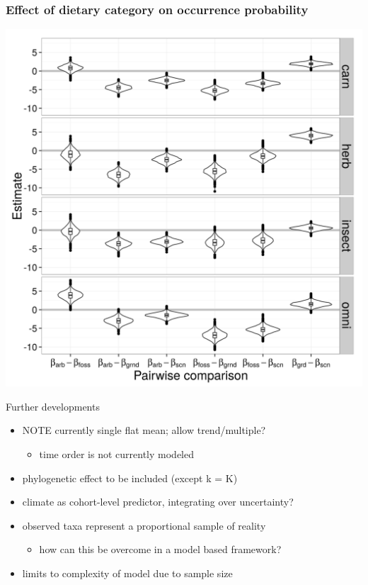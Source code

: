 \documentclass{beamer}
\begin{document}
\begin{frame}
  \frametitle{Effect of dietary category on occurrence probability}
  \begin{center}
    \includegraphics[width=\textwidth,height=0.8\textheight,keepaspectratio=true]{figure/diet_eff}
  \end{center}
\end{frame}

\begin{frame}
  \begin{block}{Further developments}
    \begin{itemize}
      \item \uppercase{\alert{note}} currently single flat mean; allow trend/multiple?
        \begin{itemize}
          \item time order is not currently modeled
        \end{itemize}
      \item phylogenetic effect to be included (except k = K)
      \item climate as cohort-level predictor, integrating over uncertainty?
      \item observed taxa represent a proportional sample of reality
        \begin{itemize}
          \item how can this be overcome in a \alert{model based} framework?
        \end{itemize}
      \item limits to complexity of model due to sample size
    \end{itemize}
  \end{block}
\end{frame}
\end{document}
